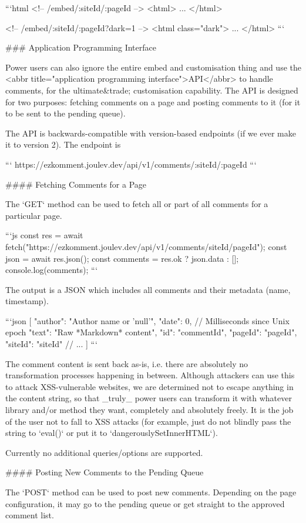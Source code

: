 \documentclass[11pt]{article}
\begin{document}
\begin{markdown}
```html
<!-- /embed/:siteId/:pageId -->
<html>
  ...
</html>

<!-- /embed/:siteId/:pageId?dark=1 -->
<html class="dark">
  ...
</html>
```

### Application Programming Interface

Power users can also ignore the entire embed and customisation thing and use the <abbr title="application programming interface">API</abbr> to handle comments, for the ultimate&trade; customisation capability. The API is designed for two purposes: fetching comments on a page and posting comments to it (for it to be sent to the pending queue).

The API is backwards-compatible with version-based endpoints (if we ever make it to version 2). The endpoint is

```
https://ezkomment.joulev.dev/api/v1/comments/:siteId/:pageId
```

#### Fetching Comments for a Page

The `GET` method can be used to fetch all or part of all comments for a particular page.

```js
const res = await fetch("https://ezkomment.joulev.dev/api/v1/comments/siteId/pageId");
const json = await res.json();
const comments = res.ok ? json.data : [];
console.log(comments);
```

The output is a JSON which includes all comments and their metadata (name, timestamp).

```json
[
  {
    "author": "Author name or 'null'",
    "date": 0, // Milliseconds since Unix epoch
    "text": "Raw *Markdown* content",
    "id": "commentId",
    "pageId": "pageId",
    "siteId": "siteId"
  }
  // ...
]
```

The comment content is sent back as-is, i.e. there are absolutely no transformation processes happening in between. Although attackers can use this to attack XSS-vulnerable websites, we are determined not to escape anything in the content string, so that _truly_ power users can transform it with whatever library and/or method they want, completely and absolutely freely. It is the job of the user not to fall to XSS attacks (for example, just do not blindly pass the string to `eval()` or put it to `dangerouslySetInnerHTML`).

Currently no additional queries/options are supported.

#### Posting New Comments to the Pending Queue

The `POST` method can be used to post new comments. Depending on the page configuration, it may go to the pending queue or get straight to the approved comment list.


\end{markdown}
\end{document}

